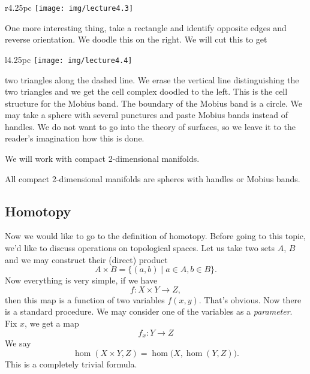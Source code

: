 \begin{wrapfigure}{r}{4.25pc}
  \vspace{-24pt}
  \texttt{[image: img/lecture4.3]}
  \vspace{-24pt}
\end{wrapfigure}
One more interesting thing, take a rectangle and identify
opposite edges and reverse orientation. We doodle this on the
right. We will cut this to get 

\begin{wrapfigure}{l}{4.25pc}
  \vspace{-16pt}
  \texttt{[image: img/lecture4.4]}
  \vspace{-16pt}
\end{wrapfigure}
\noindent two triangles along the dashed
line. We erase the vertical line distinguishing the two
triangles and we get the cell complex doodled to the left. This
is the cell structure for the Mobius band.
The boundary of the Mobius band is a circle. We may take a sphere
with several punctures and paste Mobius bands instead of
handles. We do not want to go into the theory of surfaces, so we
leave it to the reader's imagination how this is done.

We will work with compact 2-dimensional manifolds.

\begin{thm}
All compact 2-dimensional manifolds are spheres with handles or
Mobius bands.
\end{thm}

\subsection{Homotopy}
Now we would like to go to the definition of homotopy. Before
going to this topic, we'd like to discuss operations on
topological spaces. Let us take two sets $A$, $B$ and we may
construct their (direct) product
\begin{equation}
A\times B=\{(a,b)\mid a\in A, b\in B\}.
\end{equation}
Now everything is very simple, if we have
\begin{equation}
f\colon X\times Y\to Z,
\end{equation}
then this map is a function of two variables $f(x,y)$. That's
obvious. Now there is a standard procedure. We may consider one
of the variables as a \emph{parameter}. Fix $x$, we get a map
\begin{equation}
f_{x}\colon Y\to Z
\end{equation}
We say
\begin{equation}
\hom(X\times Y,Z)=\hom\bigl(X,\hom(Y,Z)\bigr).
\end{equation}
This is a completely trivial formula.

